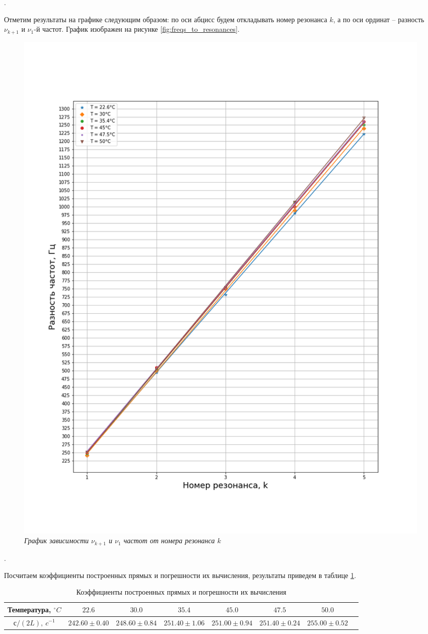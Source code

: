\documentclass[a4paper, 12pt]{article}
\newcounter{Points}
\newcommand{\point}{\arabic{Points}. \addtocounter{Points}{1}}
\begin{document}
\point Отметим результаты на графике следующим образом: по оси абцисс будем откладывать номер резонанса $k$, а по оси ординат -- разность $\nu_{k + 1}$ и $\nu_1$-й частот. График изображен на рисунке \ref{fig:freqs_to_resonances}.

\begin{figure}[h]
    \centering
    \includegraphics[width=\linewidth]{freqs_to_resonances.png}
    \caption{\textit{График зависимости $\nu_{k + 1}$ и $\nu_1$ частот от номера резонанса $k$}}
    \label{freqs_to_resonances}
\end{figure}

\point Посчитаем коэффициенты построенных прямых и погрешности их вычисления, результаты приведем в таблице \ref{tabl:line_coefs}.


\begin{table}[h]
    \centering
    \small
    \setlength\tabcolsep{3pt}

    \begin{tabular}{|c|c|c|c|c|c|c|c|}
    \hline 
    Температура, $^\circ C$ & $22.6$ & $30.0$ & $35.4$ & $45.0$ & $47.5$ & $50.0$ \\ \hline

    $с / (2 L),~ c^{-1}$ & $242.60 \pm 0.40$ & $248.60 \pm 0.84$ & $251.40 \pm 1.06$ & $251.00 \pm 0.94$ & $251.40 \pm 0.24$ & $255.00 \pm 0.52$ \\ \hline
    \end{tabular}
	\caption{Коэффициенты построенных прямых и погрешности их вычисления}
    \label{tabl:line_coefs}
\end{table}
\end{document}
